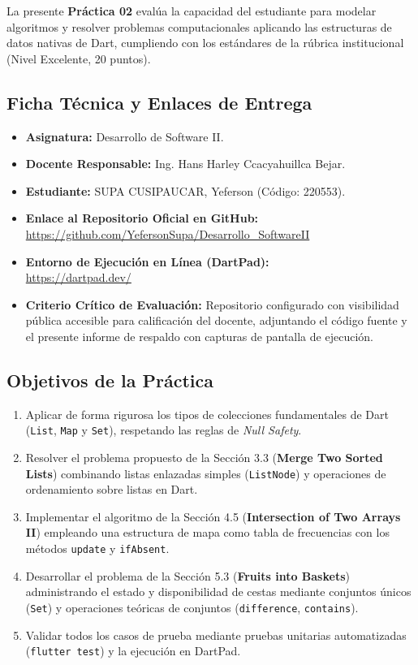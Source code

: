 \documentclass[12pt,a4paper]{article}
\begin{document}
La presente \textbf{Práctica 02} evalúa la capacidad del estudiante para modelar algoritmos y resolver problemas computacionales aplicando las estructuras de datos nativas de Dart, cumpliendo con los estándares de la rúbrica institucional (Nivel Excelente, 20 puntos).

\subsection{Ficha Técnica y Enlaces de Entrega}
\begin{itemize}[leftmargin=*]
    \item \textbf{Asignatura:} Desarrollo de Software II.
    \item \textbf{Docente Responsable:} Ing. Hans Harley Ccacyahuillca Bejar.
    \item \textbf{Estudiante:} SUPA CUSIPAUCAR, Yeferson (Código: 220553).
    \item \textbf{Enlace al Repositorio Oficial en GitHub:} \\
    \url{https://github.com/YefersonSupa/Desarrollo_SoftwareII}
    \item \textbf{Entorno de Ejecución en Línea (DartPad):} \\
    \url{https://dartpad.dev/}
    \item \textbf{Criterio Crítico de Evaluación:} Repositorio configurado con visibilidad pública accesible para calificación del docente, adjuntando el código fuente y el presente informe de respaldo con capturas de pantalla de ejecución.
\end{itemize}

\subsection{Objetivos de la Práctica}
\begin{enumerate}
    \item Aplicar de forma rigurosa los tipos de colecciones fundamentales de Dart (\texttt{List}, \texttt{Map} y \texttt{Set}), respetando las reglas de \textit{Null Safety}.
    \item Resolver el problema propuesto de la Sección 3.3 (\textbf{Merge Two Sorted Lists}) combinando listas enlazadas simples (\texttt{ListNode}) y operaciones de ordenamiento sobre listas en Dart.
    \item Implementar el algoritmo de la Sección 4.5 (\textbf{Intersection of Two Arrays II}) empleando una estructura de mapa como tabla de frecuencias con los métodos \texttt{update} y \texttt{ifAbsent}.
    \item Desarrollar el problema de la Sección 5.3 (\textbf{Fruits into Baskets}) administrando el estado y disponibilidad de cestas mediante conjuntos únicos (\texttt{Set}) y operaciones teóricas de conjuntos (\texttt{difference}, \texttt{contains}).
    \item Validar todos los casos de prueba mediante pruebas unitarias automatizadas (\texttt{flutter test}) y la ejecución en DartPad.
\end{enumerate}
\end{document}
